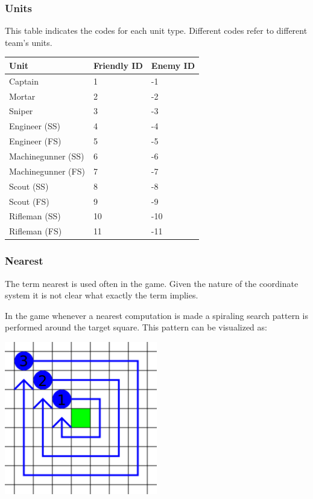 \documentclass{article}
\begin{document}
\subsubsection{Units}

This table indicates the codes for each unit type. Different codes refer to
different team's units.

\begin{minipage}{\textwidth}
\centering
\begin{tabular}{lll}
    \hline Unit & Friendly ID & Enemy ID \\ \hline
    Captain & 1 & -1 \\
    Mortar & 2 & -2 \\
    Sniper & 3 & -3 \\
    Engineer (SS) & 4 & -4 \\
    Engineer (FS) & 5 & -5 \\
    Machinegunner (SS) & 6 & -6 \\
    Machinegunner (FS) & 7 & -7 \\
    Scout (SS) & 8 & -8 \\
    Scout (FS) & 9 & -9 \\
    Rifleman (SS) & 10 & -10 \\
    Rifleman (FS) & 11 & -11 \\
\end{tabular}
\end{minipage}

\subsubsection{Nearest}

The term nearest is used often in the game. Given the nature of the coordinate
system it is not clear what exactly the term implies.

In the game whenever a nearest computation is made a spiraling search pattern is
performed around the target square. This pattern can be visualized as:

{\centering\includegraphics[width=0.5\textwidth]{res/nearest.png}\par}
\end{document}
